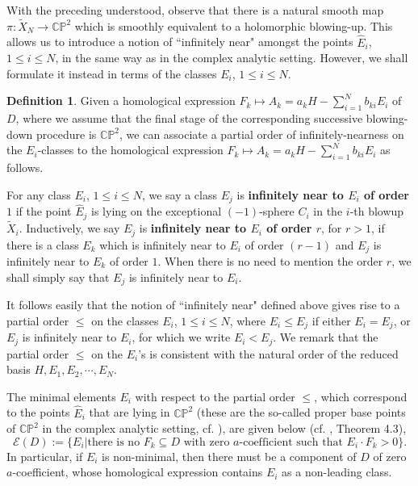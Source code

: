 \documentclass[11pt]{amsart}
\theoremstyle{plain}
\numberwithin{theorem}{section}
\theoremstyle{definition}
\newtheorem{definition}[theorem]{Definition}
\newcommand{\C}{{\mathbb C}}
\renewcommand{\P}{{\mathbb P}}
\newcommand{\E}{{\mathcal E}}
\begin{document}
With the preceding understood, observe that there is a natural smooth map 
$\pi: \tilde{X}_N\rightarrow \C\P^2$ which is smoothly equivalent to a holomorphic blowing-up. This allows us to introduce a notion of ``infinitely near" amongst the points $\hat{E}_i$, $1\leq i\leq N$, in the same way as in the complex analytic setting. However, we shall formulate it instead in terms of the classes $E_i$, $1\leq i\leq N$. 

\begin{definition}
Given a homological expression $F_k\mapsto A_k=a_k H-\sum_{i=1}^N b_{ki} E_i$ of $D$, where we assume that the final stage of the corresponding successive blowing-down procedure is $\C\P^2$, we can associate a partial order of infinitely-nearness on the $E_i$-classes to the homological expression 
$F_k\mapsto A_k=a_k H-\sum_{i=1}^N b_{ki} E_i$ as follows. 

For any class $E_i$, $1\leq i\leq N$, we say a class $E_j$ is {\bf infinitely near to $E_i$ of order $1$} if the point $\hat{E}_j$ is lying on the exceptional $(-1)$-sphere $C_i$ in the $i$-th blowup $\tilde{X}_i$.
Inductively, we say $E_j$ is {\bf infinitely near to $E_i$ of order $r$}, for $r>1$, if there is a class
$E_k$ which is infinitely near to $E_i$ of order $(r-1)$ and $E_j$ is infinitely near to $E_k$ of order $1$. 
When there is no need to mention the order $r$, we shall simply say that $E_j$ is infinitely near to $E_i$. 

It follows easily that the notion of ``infinitely near" defined above gives rise to a partial order $\leq$ on the classes $E_i$, $1\leq i\leq N$, where $E_i\leq E_j$ if either $E_i=E_j$, or $E_j$ is infinitely near to $E_i$, for which we 
write $E_i<E_j$. We remark that the partial order $\leq$ on the $E_i$'s is consistent with the natural order of the reduced basis $H,E_1,E_2,\cdots,E_N$. 
\end{definition}


The minimal elements $E_i$ with respect to the partial order $\leq$, which correspond to the points 
$\hat{E}_i$ that are lying in $\C\P^2$ (these are the so-called proper base points of $\C\P^2$ in the complex analytic setting, cf. \cite{AC, Bea}), are given below (cf. \cite{C1}, Theorem 4.3),
$$
\E(D):=\{E_i|\mbox{there is no $F_k\subseteq D$ with zero $a$-coefficient such that $E_i\cdot F_k>0$}\}.
$$
In particular, if $E_i$ is non-minimal, then there must be a component of $D$ of zero $a$-coefficient, whose homological expression contains $E_i$ as a non-leading class.
\end{document}
